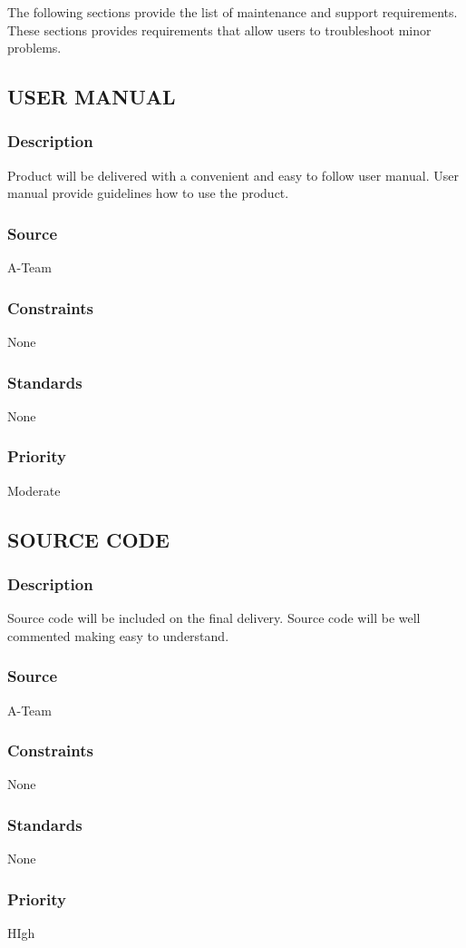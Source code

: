 The following sections provide the list of maintenance and support requirements. These sections provides requirements that allow users to troubleshoot minor problems. 

\subsection{USER MANUAL}
\subsubsection{Description}
Product will be delivered with a convenient and easy to follow user manual. User manual provide guidelines how to use the product. 
\subsubsection{Source}
A-Team 
\subsubsection{Constraints}
None
\subsubsection{Standards}
None
\subsubsection{Priority}
Moderate

\subsection{SOURCE CODE}
\subsubsection{Description}
Source code will be included on the final delivery. Source code will be well commented making easy to understand. 
\subsubsection{Source}
A-Team 
\subsubsection{Constraints}
None
\subsubsection{Standards}
None
\subsubsection{Priority}
HIgh

